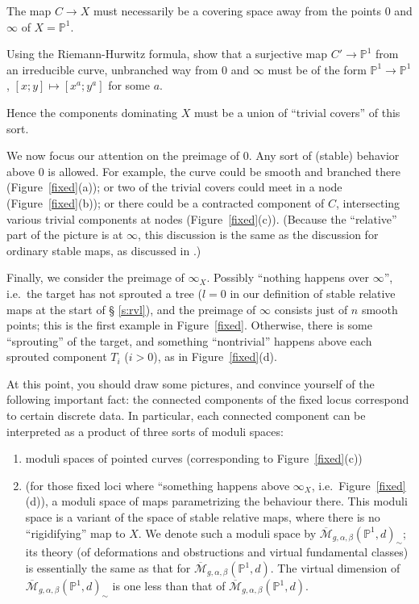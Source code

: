 \documentclass[12pt,letterpaper]{amsart}
\newcommand{\point}{\vspace{3mm}\par \noindent \refstepcounter{subsection}{\bf \thesubsection.} }
\newcommand{\proj}{\mathbb P}
\newcommand{\cm}{{\mathcal{M}}}
\newcommand{\cmbar}{\overline{\cm}}
\newcommand{\al}{\alpha}
\newcommand{\be}{\beta}
\newcommand{\lremind}[1]{{\bf[label:  #1]}}
\renewcommand{\lremind}[1]{{}}
\begin{document}
{The map $C \rightarrow X$ must necessarily be a covering space away
from the points $0$ and $\infty$ of $X=\proj^1$.

Using the Riemann-Hurwitz formula, show that a surjective map $C'
\rightarrow \proj^1$ from an irreducible curve, unbranched way from
$0$ and $\infty$ must be of the form $\proj^1 \rightarrow \proj^1$,
$[x;y] \mapsto [x^a; y^a]$ for some $a$.

\point Hence the components dominating $X$ must be a union of ``trivial
covers'' of this sort.  \label{trivialcoverdef}\lremind{trivialcoverdef}

We now focus our attention on the preimage of $0$.  Any sort of
(stable) behavior above $0$ is allowed.  For example, the curve could
be smooth and branched there (Figure~\ref{fixed}(a)); or two of the
trivial covers could meet in a node (Figure~\ref{fixed}(b)); or there
could be a contracted component of $C$, intersecting various trivial
components at nodes (Figure~\ref{fixed}(c)).  (Because the
``relative'' part of the picture is at $\infty$, this discussion is
the same as the discussion for ordinary stable maps, as discussed in
\cite{vl}.)

Finally, we consider the preimage of $\infty_X$.  Possibly ``nothing
happens over $\infty$'', i.e.\ the target has not sprouted a tree
($l=0$ in our definition of stable relative maps at the start of \S
\ref{s:rvl}), and the preimage of $\infty$ consists just of $n$ smooth
points; this is the first example in
Figure~\ref{fixed}.  Otherwise, there is some ``sprouting'' of the target, and something
``nontrivial'' happens above each sprouted component $T_i$ ($i>0$), as in
Figure~\ref{fixed}(d).

\point At this point, you should draw some pictures, and convince yourself of
the following important fact: the connected components of the fixed
locus correspond to certain discrete data.  In particular, each
connected component can be interpreted as a product of three sorts
of moduli spaces:\label{atthispoint}\lremind{atthispoint}
\begin{enumerate}
\item[(A)] moduli spaces of pointed curves (corresponding to Figure~\ref{fixed}(c))
\item[(B)] (for those fixed loci where ``something happens above $\infty_X$,
i.e.\ Figure~\ref{fixed}(d)), a moduli space of maps parametrizing the
behaviour there.  This  moduli space is a variant of the space of
stable relative maps, where there is no ``rigidifying'' map to $X$.
We denote such a moduli space by
$\cmbar_{g,\al,\be}(\proj^1,d)_{\sim}$; its theory (of deformations
and obstructions and virtual fundamental classes) is essentially the
same as that for $\cmbar_{g,\al, \be}(\proj^1,d)$.
The virtual dimension of 
$\cmbar_{g,\al,\be}(\proj^1,d)_{\sim}$ is one less than that of
$\cmbar_{g,\al,\be}(\proj^1,d)$.


\end{enumerate}}
\end{document}
